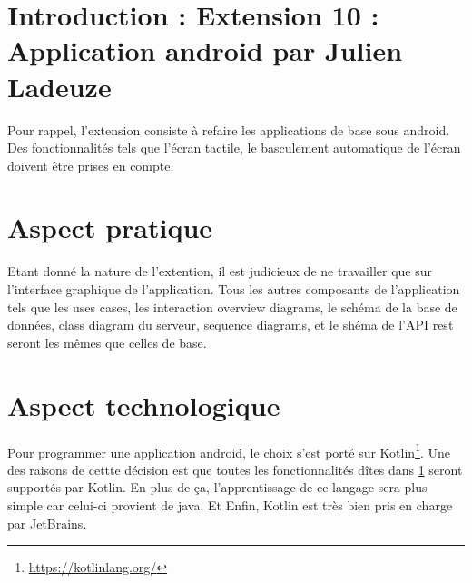 \section{Introduction : Extension 10 : Application android par Julien Ladeuze}\label{INTRODUCTION}
\begin{flushleft}
Pour rappel, l'extension consiste à refaire les applications de base sous android. Des fonctionnalités tels que l'écran tactile, le basculement automatique de l'écran doivent être prises en compte.
\end{flushleft}
\section{Aspect pratique}
\begin{flushleft}
Etant donné la nature de l'extention, il est judicieux de ne travailler que sur l'interface graphique de l'application. Tous les autres composants de l'application tels que les uses cases, les interaction overview diagrams, le schéma de la base de données, class diagram du serveur, sequence diagrams, et le shéma de l'API rest seront les mêmes que celles de base.
\end{flushleft}
\section{Aspect technologique}
\begin{flushleft}
Pour programmer une application android, le choix s'est porté sur Kotlin\footnote{\url{https://kotlinlang.org/}}. Une des raisons de cettte décision est que toutes les fonctionnalités dîtes dans \ref{INTRODUCTION} seront supportés par Kotlin. En plus de ça, l'apprentissage de ce langage sera plus simple car celui-ci provient de java. Et Enfin, Kotlin est très bien pris en charge par JetBrains.
\end{flushleft}

